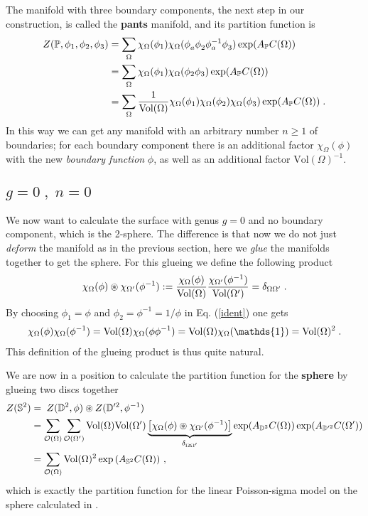 \documentclass[a4paper,twoside,11pt]{article}
\numberwithin{equation}{section}
\begin{document}
The manifold with three boundary components, the next step in our construction, is called the {\bf pants} manifold, and 
its partition function is 
\begin{align}
Z(\mathbb{P},\phi_1,\phi_2,\phi_3)&=\sum\limits_\Omega\chi_\Omega(\phi_1)\chi_\Omega(\phi_a^{}\phi_2^{}
\phi_a^{-1}\phi_3^{})\exp(A_{\mathbb{P}}C(\Omega))\notag\\
& =\sum\limits_\Omega\chi_\Omega(\phi_1)\chi_\Omega(\phi_2\phi_3)\exp(A_{\mathbb{P}}C(\Omega))\notag\\
& =\sum\limits_\Omega\frac{1}{\text{Vol}(\Omega)}\chi_\Omega(\phi_1)\chi_\Omega(\phi_2)\chi_\Omega(\phi_3)
\exp(A_{\mathbb{P}}C(\Omega))\;.
\end{align}
In this way we can get any manifold with an arbitrary number $n\geq 1$ of boundaries; for each boundary 
component there is an additional factor $\chi_\Omega(\phi)$ with the new {\it boundary function}
 $\phi$, 
as well as an additional 
factor $\text{Vol}(\Omega)^{-1}$.
%
%
\subsection{$g=0\;,\;n=0$}
We now want to calculate the surface  with genus $g=0$ and no boundary component, which is the 2-sphere. The difference is that now we do not just {\it deform} the manifold as in the previous section, 
here we {\it glue} the manifolds together to get the sphere. For this glueing we define the following 
product  
\begin{gather}
\chi_{\Omega}(\phi)\circledast\chi_{\Omega^\prime}(\phi^{-1}):=\frac{\chi_{\Omega}(\phi)}{\text{Vol}(\Omega)}
\frac{\chi_{\Omega^\prime}(\phi^{-1})}{\text{Vol}(\Omega^\prime)}=\delta_{\Omega\Omega'}\;.
\label{glu}\end{gather} 
By choosing $\phi_1=\phi$ and $\phi_2=\phi^{-1}=1/\phi$ in Eq. (\ref{ident}) one 
gets
\begin{gather}
\chi_\Omega(\phi)\chi_\Omega(\phi^{-1})=\Vol(\Omega)\chi_\Omega(\phi\phi^{-1})=\Vol(\Omega)\chi_\Omega
(\mathds{1})=\Vol(\Omega)^2\;.
\end{gather}
This definition of the glueing product is thus quite natural.

We are now in a position to calculate the partition function for the {\bf sphere} by glueing two discs 
together
\begin{align}
Z(\mathbb{S}^2) &= \; Z(\mathbb{D}^2,\phi)\circledast Z(\mathbb{D}^{\prime2},\phi^{-1})\notag\\
& =\sum_{\mathcal{O}(\Omega)}\sum_{\mathcal{O}(\Omega^\prime)}\text{Vol}(\Omega)\text{Vol}(\Omega^\prime)
\underbrace{\left[\chi_{\Omega}(\phi)\circledast\chi_{\Omega^{\prime}}(\phi^{-1})
\right]}_{\delta_{\Omega\Omega^\prime}}
\exp(A_{\mathbb{D}^2}C(\Omega))\exp(A_{\mathbb{D}^{\prime 2}}C(\Omega^\prime)\notag)\\
& =\sum_{\mathcal{O}(\Omega)}{\text{Vol}}(\Omega)^2\exp\left(A_{\mathbb{S}^2}C(\Omega)\right)\,,
\end{align}
which is exactly the partition function for the linear Poisson-sigma model on the sphere calculated in \cite{HS}.
\end{document}
